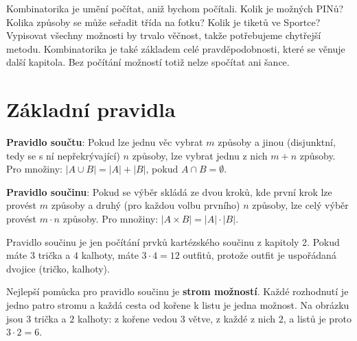 \label{kap:kombinatorika}

Kombinatorika je umění počítat, aniž bychom počítali. Kolik je možných PINů? Kolika způsoby se může seřadit třída na fotku? Kolik je tiketů ve Sportce? Vypisovat všechny možnosti by trvalo věčnost, takže potřebujeme chytřejší metodu. Kombinatorika je také základem celé pravděpodobnosti, které se věnuje další kapitola. Bez počítání možností totiž nelze spočítat ani šance.

\section{Základní pravidla}\label{sec:kombinatorika-pravidla}

\begin{definitionbox}
  \textbf{Pravidlo součtu}: Pokud lze jednu věc vybrat $m$ způsoby a jinou (disjunktní, tedy se s ní nepřekrývající) $n$ způsoby, lze vybrat jednu z nich $m + n$ způsoby. Pro množiny: $|A\cup B| = |A| + |B|$, pokud $A\cap B = \emptyset$.

  \vspace{0.2cm}

  \textbf{Pravidlo součinu}: Pokud se výběr skládá ze dvou kroků, kde první krok lze provést $m$ způsoby a druhý (pro každou volbu prvního) $n$ způsoby, lze celý výběr provést $m\cdot n$ způsoby. Pro množiny: $|A\times B| = |A|\cdot|B|$.
\end{definitionbox}

Pravidlo součinu je jen počítání prvků kartézského součinu z kapitoly 2. Pokud máte $3$ trička a $4$ kalhoty, máte $3\cdot 4 = 12$ outfitů, protože outfit je uspořádaná dvojice (tričko, kalhoty).

Nejlepší pomůcka pro pravidlo součinu je \textbf{strom možností}. Každé rozhodnutí je jedno patro stromu a každá cesta od kořene k listu je jedna možnost. Na obrázku jsou $3$ trička a $2$ kalhoty: z kořene vedou $3$ větve, z každé z nich $2$, a listů je proto $3\cdot 2 = 6$.
\begin{center}
\end{center}

